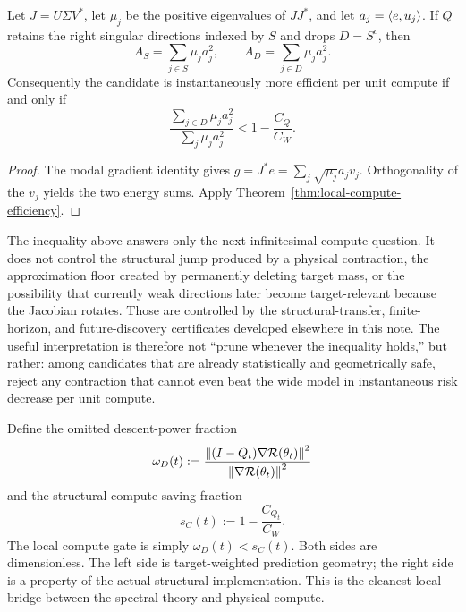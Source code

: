 \begin{corollary}\label{cor:local-compute-spectral}
Let $J=U\Sigma V^\ast$, let $\mu_j$ be the positive eigenvalues of $JJ^\ast$, and let $a_j=\langle e,u_j\rangle$. If $Q$ retains the right singular directions indexed by $S$ and drops $D=S^c$, then
\[
A_S=\sum_{j\in S}\mu_j a_j^2,
\qquad
A_D=\sum_{j\in D}\mu_j a_j^2.
\]
Consequently the candidate is instantaneously more efficient per unit compute if and only if
\[
\boxed{
\frac{\sum_{j\in D}\mu_j a_j^2}
{\sum_j\mu_j a_j^2}
<
1-\frac{C_Q}{C_W}.}
\]
\end{corollary}

\begin{proof}
The modal gradient identity gives
$g=J^\ast e=\sum_j\sqrt{\mu_j}a_jv_j$.
Orthogonality of the $v_j$ yields the two energy sums. Apply Theorem~\ref{thm:local-compute-efficiency}.
\end{proof}

\begin{remark}
The inequality above answers only the next-infinitesimal-compute question. It does not control the structural jump produced by a physical contraction, the approximation floor created by permanently deleting target mass, or the possibility that currently weak directions later become target-relevant because the Jacobian rotates. Those are controlled by the structural-transfer, finite-horizon, and future-discovery certificates developed elsewhere in this note. The useful interpretation is therefore not ``prune whenever the inequality holds,'' but rather: among candidates that are already statistically and geometrically safe, reject any contraction that cannot even beat the wide model in instantaneous risk decrease per unit compute.
\end{remark}

\begin{remark}
Define the omitted descent-power fraction
\[
\omega_D(t):=
\frac{\left\lVert (I-Q_t)\nabla\mathcal R(\theta_t)\right\rVert^2}
{\left\lVert \nabla\mathcal R(\theta_t)\right\rVert^2}
\]
and the structural compute-saving fraction
\[
s_C(t):=1-\frac{C_{Q_t}}{C_W}.
\]
The local compute gate is simply $\omega_D(t)<s_C(t)$. Both sides are dimensionless. The left side is target-weighted prediction geometry; the right side is a property of the actual structural implementation. This is the cleanest local bridge between the spectral theory and physical compute.
\end{remark}

